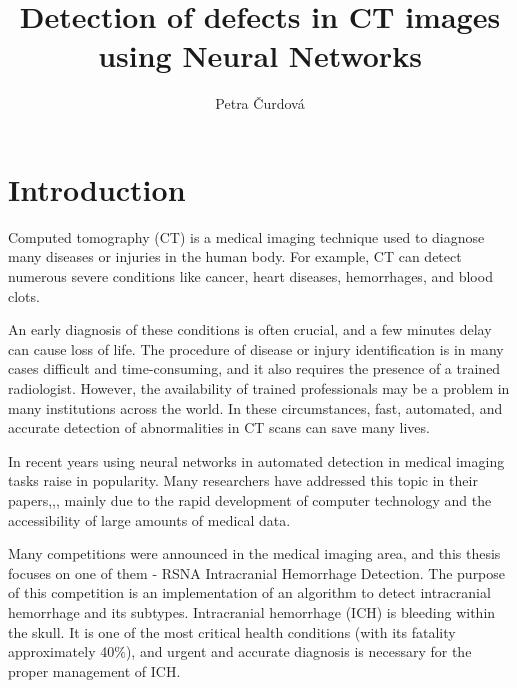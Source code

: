 \documentclass[thesis=B,english]{FITthesis}[2019/12/23]
\title{Detection of defects in CT images using Neural Networks}
\author{Petra Čurdová} %
\begin{document}

\chapter{Introduction}
Computed tomography (CT) is a medical imaging technique used to diagnose many diseases or injuries in the human body. For example, CT can detect numerous severe conditions like cancer, heart diseases, hemorrhages, and blood clots.\cite{nibib_ct} 

An early diagnosis of these conditions is often crucial, and a few minutes delay can cause loss of life. The procedure of disease or injury identification is in many cases difficult and time-consuming, and it also requires the presence of a trained radiologist. However, the availability of trained professionals may be a problem in many institutions across the world. In these circumstances, fast, automated, and accurate detection of abnormalities in CT scans can save many lives.

In recent years using neural networks in automated detection in medical imaging tasks raise in popularity. Many researchers have addressed this topic in their papers\cite{Kuo22737},\cite{Cho2019},\cite{Chang1609}, mainly due to the rapid development of computer technology and the accessibility of large amounts of medical data.

Many competitions were announced in the medical imaging area, and this thesis focuses on one of them - RSNA Intracranial Hemorrhage Detection\cite{kaggle_competition}. The purpose of this competition is an implementation of an algorithm to detect intracranial hemorrhage and its subtypes. Intracranial hemorrhage (ICH) is bleeding within the skull. It is one of the most critical health conditions (with its fatality approximately 40\%)\cite{VANASCH2010167}, and urgent and accurate diagnosis is necessary for the proper management of ICH.
\end{document}
